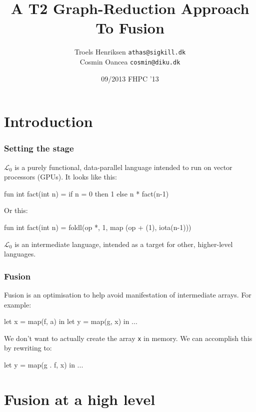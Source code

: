 \documentclass{beamer}
\title{A T2 Graph-Reduction Approach To Fusion}
\author[T.Henriksen,C.Oancea]{Troels Henriksen {\tt athas@sigkill.dk}\\Cosmin Oancea {\tt cosmin@diku.dk}}
\institute{Department of Computer Science (DIKU)\\University of Copenhagen}
\date[09/23]{09/2013 \textsc{FHPC} '13}
\newcommand{\LO}{$\mathcal{L}_0$}
\begin{document}
\titleslide

\begin{frame}[fragile]
  \tableofcontents
\end{frame}



\section{Introduction}

\begin{frame}[fragile,t]
  \frametitle{Setting the stage}
  \LO{} is a purely functional, data-parallel language intended to run
  on vector processors (GPUs).  It looks like this:

  \begin{colorcode}
    fun int fact(int n) =
      if n = 0 then 1 else n * fact(n-1)
  \end{colorcode}

  Or this:

  \begin{colorcode}
    fun int fact(int n) =
      foldl(op *, 1, map (op + (1), iota(n-1)))
  \end{colorcode}

  \LO{} is an intermediate language, intended as a target for other,
  higher-level languages.
\end{frame}

\begin{frame}[fragile,t]
  \frametitle{Fusion}

  Fusion is an optimisation to help avoid manifestation of
  intermediate arrays.  For example:

  \begin{colorcode}
    let x = map(f, a) in
    let y = map(g, x) in
    ...
  \end{colorcode}

\pause

We don't want to actually create the array {\tt x} in memory.  We can
accomplish this by rewriting to:

  \begin{colorcode}
    let y = map(g . f, x) in
    ...
  \end{colorcode}
\end{frame}

\section{Fusion at a high level}
\end{document}
